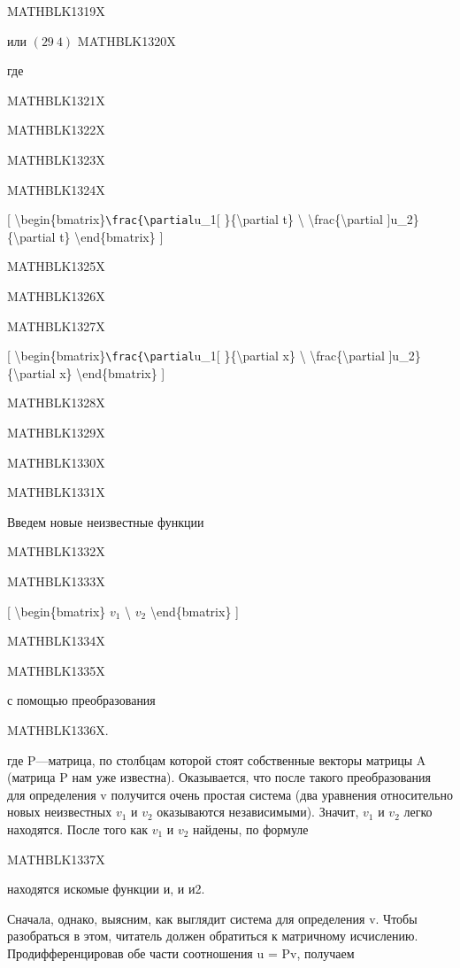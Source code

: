 \documentclass[
]{article}
\begin{document}
{{{MATHBLK1319X

или \((29 \ 4)\) MATHBLK1320X

где

MATHBLK1321X

MATHBLK1322X

MATHBLK1323X

MATHBLK1324X

{[}
\textbackslash begin\{bmatrix\}\texttt{\textbackslash{}frac\{\textbackslash{}partial}u\_1{[}
\}\{\textbackslash partial t\} \textbackslash{}
\textbackslash frac\{\textbackslash partial
{]}u\_2\}\{\textbackslash partial t\} \textbackslash end\{bmatrix\} {]}

MATHBLK1325X

MATHBLK1326X

MATHBLK1327X

{[}
\textbackslash begin\{bmatrix\}\texttt{\textbackslash{}frac\{\textbackslash{}partial}u\_1{[}
\}\{\textbackslash partial x\} \textbackslash{}
\textbackslash frac\{\textbackslash partial
{]}u\_2\}\{\textbackslash partial x\} \textbackslash end\{bmatrix\} {]}

MATHBLK1328X

MATHBLK1329X

MATHBLK1330X

MATHBLK1331X

Введем новые неизвестные функции

MATHBLK1332X

MATHBLK1333X

{[} \textbackslash begin\{bmatrix\} \(v_1\) \textbackslash{} \(v_2\)
\textbackslash end\{bmatrix\} {]}

MATHBLK1334X

MATHBLK1335X

с помощью преобразования

MATHBLK1336X.

где P---матрица, по столбцам которой стоят собственные векторы матрицы A
(матрица P нам уже известна). Оказывается, что после такого
преобразования для определения v получится очень простая система (два
уравнения относительно новых неизвестных \(v_1\) и \(v_2\) оказываются
независимыми). Значит, \(v_1\) и \(v_2\) легко находятся. После того как
\(v_1\) и \(v_2\) найдены, по формуле

MATHBLK1337X

находятся искомые функции и, и и2.

Сначала, однако, выясним, как выглядит система для определения v. Чтобы
разобраться в этом, читатель должен обратиться к матричному исчислению.
Продифференцировав обе части соотношения u = Pv, получаем

}}}
\end{document}

